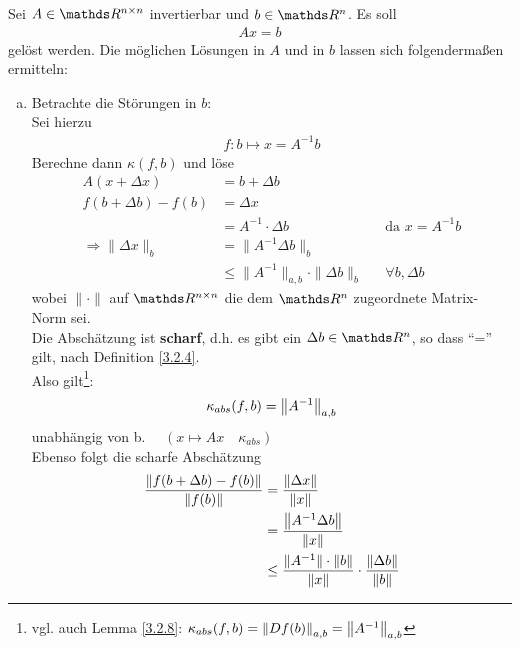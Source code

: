 \begin{Bspe}
  \label{3.2.10}
  Sei $A\in \R^{n\times n}$ invertierbar und $b\in \R^n$. Es soll 
  \begin{gather*}
    Ax =b
  \end{gather*}
  gelöst werden.
  Die möglichen Lösungen in $A$ und in $b$ lassen sich folgendermaßen ermitteln:
  \begin{enumerate}[a)]
  \item Betrachte die Störungen in $b$:\\
    Sei hierzu
    \begin{gather*}
      f: b\mapsto x= A^{-1}b 
    \end{gather*}
    Berechne dann $ \kappa(f,b)$ und löse 
    \begin{align*}
      A(x + \Delta x) &= b+\Delta b \\
      f(b + \Delta b) - f(b) &= \Delta x \\
                      &= A^{-1} \cdot \Delta b && \text{da }x = A^{-1}b \\
      \Rightarrow \|\Delta x\|_{b}  &= \|A^{-1}\Delta b\|_{b} \\
                      &\leq \|A^{-1}\|_{a,b}\cdot \|\Delta b\|_{b} && \forall b, \Delta b 
    \end{align*}
    wobei $\|\cdot\| $ auf $\Renn$ die dem $\Ren$ zugeordnete Matrix-Norm sei. \\
    Die Abschätzung ist \textbf{scharf}, 
    d.h. es gibt ein $\Delta b\in \R^n$, so dass \enquote{=} gilt, 
    nach Definition \ref{3.2.4}. \\
    Also gilt\footnote{vgl. auch Lemma \ref{3.2.8}: $\kappa_{abs}(f,b)=\left\| Df(b) \right\|_{a,b}=\left\| A^{-1} \right\|_{a,b}$}:
    \begin{gather}
      \kappa_{abs}(f,b) = \left\| A^{-1} \right\|_{a,b} \label{III.2.6}
    \end{gather}
    unabhängig von b.  $ \quad \left( x\mapsto Ax \quad \kappa_{abs}\right)$\\
    Ebenso folgt die scharfe Abschätzung 
    \begin{align}
      \nonumber
      \frac{\|	f(b + \Delta b) - f(b)\|}{\|f(b)\|} &= \frac{\nn{\Delta x}}{\nn{x}}\\ \nonumber
                                                    & = \frac{\nn{A^{-1}\Delta b}}{\nn{x}} \\ \nonumber
                                                    & \leq  \frac{\|A^{-1}\|\cdot \|b\|}{\|x\|} \cdot \frac{\|\Delta b\|}{\|b\|} \\

\end{align}
\end{enumerate}
\end{Bspe}

